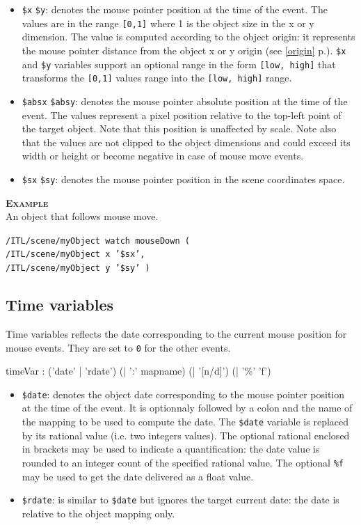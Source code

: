 \documentclass[a4paper,twoside]{report}
\newcommand{\subsublevel}[1]	{\subsection{#1}}
\newcommand{\fullref}[1]	{\ref{#1} p.\pageref{#1}}
\newcommand{\OSC}[1]		{\texttt{#1}}
\newcommand{\values}[1]	{\texttt{#1}}
\newcommand{\example}		{\textbf{\hspace{-1.5cm}\textbf{\textsc{Example }}}}
\newcommand{\sample}	[1]			{\vspace{-2mm}\begin{center}\colorbox{mygrey}{
								\begin{minipage}[t]{0.9\columnwidth} 
								{\small \texttt{#1}}
								\end{minipage}}\end{center}}
\begin{document}
\begin{itemize}
\item \OSC{\$x} \OSC{\$y}: denotes the mouse pointer position at the time of the event. The values are in the range \values{[0,1]} where 1 is the object size in the x or y dimension. The value is computed according to the object origin: it represents the mouse pointer distance from the object x or y origin (see \fullref{origin}). \OSC{\$x} and \OSC{\$y} variables support an optional range in the form \OSC{[low, high]} that transforms the \values{[0,1]}  values range into the \values{[low, high]} range.

\item \OSC{\$absx} \OSC{\$absy}: denotes the mouse pointer absolute position at the time of the event. The values represent a pixel position relative to the top-left point of the target object. Note that this position is unaffected by scale. 
Note also that the values are not clipped to the object dimensions and could exceed its width or height or become negative in case of mouse move events.

\item \OSC{\$sx} \OSC{\$sy}: denotes the mouse pointer position in the scene coordinates space. 
\end{itemize}

\example \\
An object that follows mouse move.\\
\sample{/ITL/scene/myObject watch mouseDown ( \\
\hspace*{3cm}/ITL/scene/myObject x '\$sx', \\
\hspace*{3cm}/ITL/scene/myObject y '\$sy' )}


\subsublevel{Time variables}
\label{timevar}

Time variables reflects the date corresponding to the current mouse position for mouse events. 
They are set to \values{0} for the other events. 

\begin{rail} 
timeVar :  ('date' | 'rdate') (| ':'  mapname) (| '[n/d]') (| '\%' 'f')
\end{rail}

\begin{itemize}
\item \OSC{\$date}: denotes the object date corresponding to the mouse pointer position at the time of the event. It is optionnaly followed by a colon and the name of the mapping to be used to compute the date. The \OSC{\$date} variable is replaced by its rational value (i.e. two integers values). The optional rational enclosed in brackets may be used to indicate a quantification: the date value is rounded to an integer count of the specified rational value. The optional \OSC{\%f} may be used to get the date delivered as a float value.
\item \OSC{\$rdate}: is similar to \OSC{\$date} but ignores the target current date: the date is relative to the object mapping only.
\end{itemize}
\end{document}

